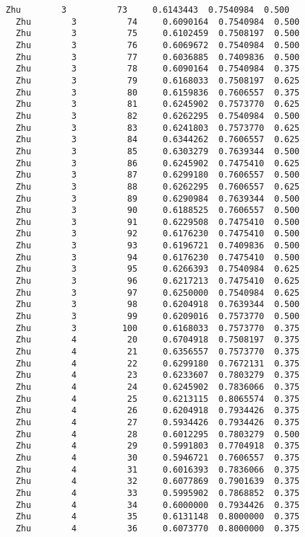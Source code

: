 \documentclass[11pt]{article}
\begin{document}
\begin{Verbatim}[commandchars=\\\{\}]
  Zhu        3          73     0.6143443  0.7540984  0.500
  Zhu        3          74     0.6090164  0.7540984  0.500
  Zhu        3          75     0.6102459  0.7508197  0.500
  Zhu        3          76     0.6069672  0.7540984  0.500
  Zhu        3          77     0.6036885  0.7409836  0.500
  Zhu        3          78     0.6090164  0.7540984  0.375
  Zhu        3          79     0.6168033  0.7508197  0.625
  Zhu        3          80     0.6159836  0.7606557  0.375
  Zhu        3          81     0.6245902  0.7573770  0.625
  Zhu        3          82     0.6262295  0.7540984  0.500
  Zhu        3          83     0.6241803  0.7573770  0.625
  Zhu        3          84     0.6344262  0.7606557  0.625
  Zhu        3          85     0.6303279  0.7639344  0.500
  Zhu        3          86     0.6245902  0.7475410  0.625
  Zhu        3          87     0.6299180  0.7606557  0.500
  Zhu        3          88     0.6262295  0.7606557  0.625
  Zhu        3          89     0.6290984  0.7639344  0.500
  Zhu        3          90     0.6188525  0.7606557  0.500
  Zhu        3          91     0.6229508  0.7475410  0.500
  Zhu        3          92     0.6176230  0.7475410  0.500
  Zhu        3          93     0.6196721  0.7409836  0.500
  Zhu        3          94     0.6176230  0.7475410  0.500
  Zhu        3          95     0.6266393  0.7540984  0.625
  Zhu        3          96     0.6217213  0.7475410  0.625
  Zhu        3          97     0.6250000  0.7540984  0.625
  Zhu        3          98     0.6204918  0.7639344  0.500
  Zhu        3          99     0.6209016  0.7573770  0.500
  Zhu        3         100     0.6168033  0.7573770  0.375
  Zhu        4          20     0.6704918  0.7508197  0.375
  Zhu        4          21     0.6356557  0.7573770  0.375
  Zhu        4          22     0.6299180  0.7672131  0.375
  Zhu        4          23     0.6233607  0.7803279  0.375
  Zhu        4          24     0.6245902  0.7836066  0.375
  Zhu        4          25     0.6213115  0.8065574  0.375
  Zhu        4          26     0.6204918  0.7934426  0.375
  Zhu        4          27     0.5934426  0.7934426  0.375
  Zhu        4          28     0.6012295  0.7803279  0.500
  Zhu        4          29     0.5991803  0.7704918  0.375
  Zhu        4          30     0.5946721  0.7606557  0.375
  Zhu        4          31     0.6016393  0.7836066  0.375
  Zhu        4          32     0.6077869  0.7901639  0.375
  Zhu        4          33     0.5995902  0.7868852  0.375
  Zhu        4          34     0.6000000  0.7934426  0.375
  Zhu        4          35     0.6131148  0.8000000  0.375
  Zhu        4          36     0.6073770  0.8000000  0.375

\end{Verbatim}
\end{document}
